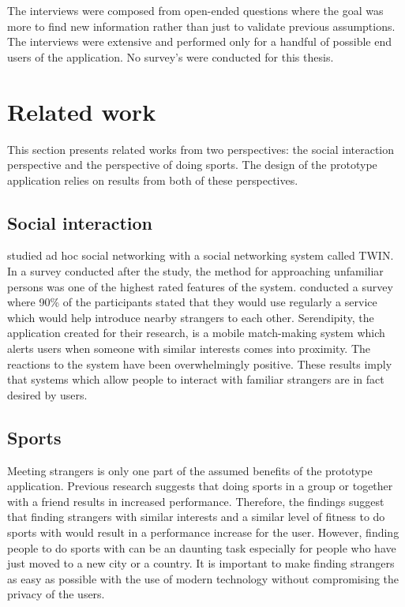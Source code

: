 The interviews were composed from open-ended questions where the goal was more to find new information rather than just to validate previous assumptions. The interviews were extensive and performed only for a handful of possible end users of the application. No survey's were conducted for this thesis.

\section{Related work}


This section presents related works from two perspectives: the social interaction perspective and the perspective of doing sports. The design of the prototype application relies on results from both of these perspectives.

\subsection{Social interaction}

\cite{socialAdHoc} studied ad hoc social networking with a social networking system called TWIN. In a survey conducted after the study, the method for approaching unfamiliar persons was one of the highest rated features of the system. \cite{mobileMatchmaking} conducted a survey where 90\% of the participants stated that they would use regularly a service which would help introduce nearby strangers to each other. Serendipity, the application created for their research, is a mobile match-making system which alerts users when someone with similar interests comes into proximity. The reactions to the system have been overwhelmingly positive. These results imply that systems which allow people to interact with familiar strangers are in fact desired by users.

\subsection{Sports}

Meeting strangers is only one part of the assumed benefits of the prototype application. Previous research suggests that doing sports in a group or together with a friend results in increased performance. Therefore, the findings suggest that finding strangers with similar interests and a similar level of fitness to do sports with would result in a performance increase for the user. However, finding people to do sports with can be an daunting task especially for people who have just moved to a new city or a country. It is important to make finding strangers as easy as possible with the use of modern technology without compromising the privacy of the users.

